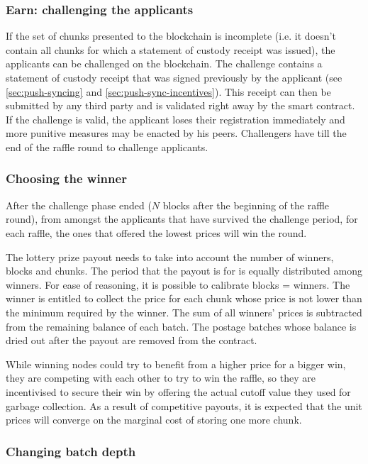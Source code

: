 \subsubsection{Earn: challenging the applicants}

If the set of chunks presented to the blockchain is incomplete (i.e. it doesn't contain all chunks for which a statement of custody receipt was issued), the applicants can be challenged on the blockchain. The challenge contains a statement of custody receipt that was signed previously by the applicant (see \ref{sec:push-syncing} and \ref{sec:push-sync-incentives}). This receipt can then be submitted by any third party and is validated right away by the smart contract. If the challenge is valid, the applicant loses their registration immediately and more punitive measures may be enacted by his peers. Challengers have till the end of the raffle round to challenge applicants.

\subsubsection{Choosing the winner}

After the challenge phase ended ($N$ blocks after the beginning of the raffle round), from amongst the applicants that have survived the challenge period, for each raffle, the ones that offered the lowest prices will win the round. 

The lottery prize payout needs to take into account the number of winners, blocks and chunks.
The period that the payout is for is equally distributed among winners. For ease of reasoning, it is possible to calibrate blocks = winners. The winner is entitled to collect the price for each chunk whose price is not lower than the minimum required by the winner. The sum of all winners' prices is subtracted from the remaining balance of each batch. The postage batches whose balance is dried out after the payout are removed from the contract.

While winning nodes could try to benefit from a higher price for a bigger win, they are competing with each other to try to win the raffle, so they are incentivised to secure their win by offering the actual cutoff value they used for garbage collection. As a result of competitive payouts, it is expected that the unit prices will converge on the marginal cost of storing one more chunk.

\subsubsection{Changing batch depth}

